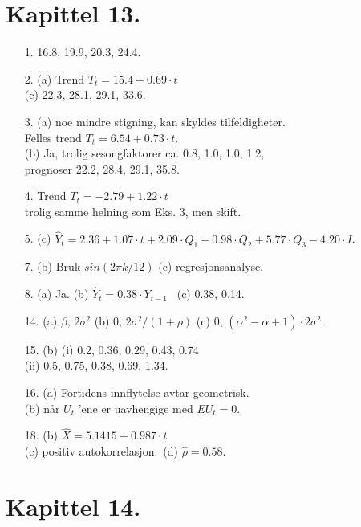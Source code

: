 \section*{Kapittel 13.}
\begin{itemize}                           
\item[1.]  16.8, 19.9, 20.3, 24.4.
\item[2.]  (a) Trend $T_t=15.4+0.69\cdot t$\\   (c) 22.3, 28.1, 29.1, 33.6.
\item[3.]  (a) noe mindre stigning, kan skyldes tilfeldigheter.\\
                  Felles trend $T_t =6.54+0.73\cdot t$.\\
            (b) Ja, trolig sesongfaktorer ca. 0.8, 1.0, 1.0, 1.2, \\
                  prognoser 22.2, 28.4, 29.1, 35.8.
\item[4.]  Trend $T_t = -2.79+1.22\cdot t$ \\
           trolig samme helning som Eks. 3, men skift.
\item[5.]  (c) $\hat{Y}_t = 2.36+1.07\cdot t+2.09\cdot Q_1 +0.98\cdot Q_2 + 
                  5.77\cdot Q_3 - 4.20\cdot I$.
\item[7.]  (b) Bruk $sin(2\pi k/12)$   (c) regresjonsanalyse.
\item[8.]  (a) Ja.   (b) $\hat{Y}_t = 0.38\cdot Y_{t-1}$ \ (c) 0.38, 0.14.
\item[14.]  (a) $\beta$, $2{\sigma}^2$  (b) 0, $2{\sigma}^2/(1+\rho)$
            (c) 0, $({\alpha}^2 - \alpha + 1)\cdot 2{\sigma}^2$ .
\item[15.]  (b) (i) 0.2, 0.36, 0.29, 0.43, 0.74 \\ (ii) 0.5, 0.75, 0.38, 
              0.69, 1.34.
\item[16.]  (a) Fortidens innflytelse avtar geometrisk.\\
              (b) når $U_t$ 'ene er uavhengige med $EU_t = 0$.
\item[18.]  (b) $\hat{X}=5.1415+0.987\cdot t$ \\
            (c) positiv autokorrelasjon.\  (d) $\hat{\rho}=0.58$.
\end{itemize}                     
         
         
\section*{Kapittel 14.}
         
